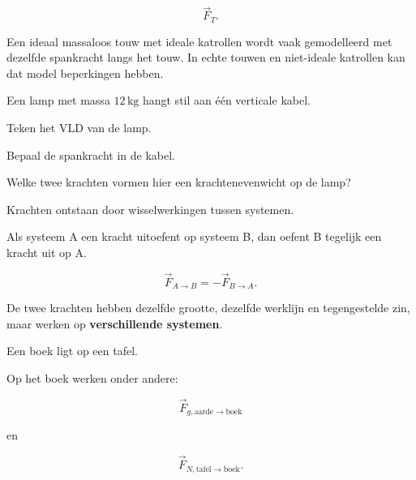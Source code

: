 \documentclass{ximera}
\begin{document}
\[
\vec F_T.
\]

Een ideaal massaloos touw met ideale katrollen wordt vaak gemodelleerd
met dezelfde spankracht langs het touw. In echte touwen en niet-ideale
katrollen kan dat model beperkingen hebben.

\begin{oefening}{\oefB}

Een lamp met massa $12\,\mathrm{kg}$ hangt stil aan één verticale kabel.

\begin{question}
Teken het VLD van de lamp.
\end{question}

\begin{question}
Bepaal de spankracht in de kabel.
\end{question}

\begin{question}
Welke twee krachten vormen hier een krachtenevenwicht op de lamp?
\end{question}

\end{oefening}




Krachten ontstaan door wisselwerkingen tussen systemen.

Als systeem A een kracht uitoefent op systeem B, dan oefent B
tegelijk een kracht uit op A.

\begin{eigenschap}

\[
\boxed{
\vec F_{A\rightarrow B}
=
-\vec F_{B\rightarrow A}.
}
\]

De twee krachten hebben dezelfde grootte, dezelfde werklijn en
tegengestelde zin, maar werken op \textbf{verschillende systemen}.
\end{eigenschap}



Een boek ligt op een tafel.

Op het boek werken onder andere:

\[
\vec F_{g,\mathrm{aarde}\rightarrow\mathrm{boek}}
\]

en

\[
\vec F_{N,\mathrm{tafel}\rightarrow\mathrm{boek}}.
\]
\end{document}
